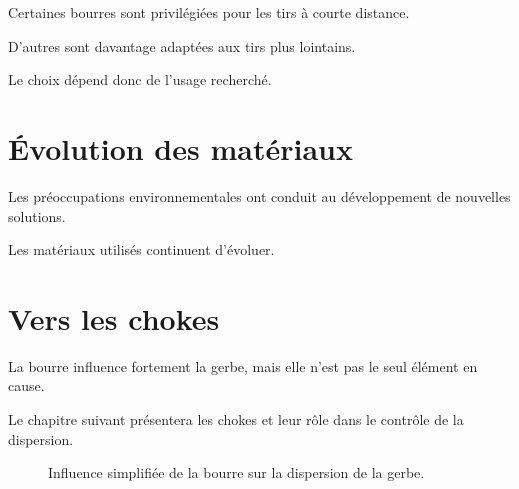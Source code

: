 Certaines bourres sont privilégiées pour les tirs à courte distance.

D'autres sont davantage adaptées aux tirs plus lointains.

Le choix dépend donc de l'usage recherché.

\section{Évolution des matériaux}

Les préoccupations environnementales ont conduit au développement de nouvelles
solutions.

Les matériaux utilisés continuent d'évoluer.

\section{Vers les chokes}

La bourre influence fortement la gerbe, mais elle n'est pas le seul élément en
cause.

Le chapitre suivant présentera les chokes et leur rôle dans le contrôle de la
dispersion.

\begin{figure}[htbp]
\centering


\caption{Influence simplifiée de la bourre sur la dispersion de la gerbe.}
\label{fig:influence_bourre_gerbe}

\end{figure}

